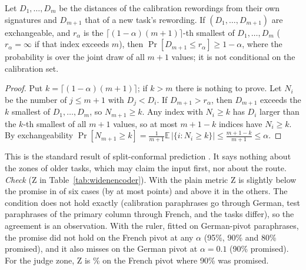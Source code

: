 \begin{table}[t]
  \caption{Sibling tasks that collide. (3): the unedited instruction of the arriving task lies inside the zone of the older task under the encoder zone (first 15 collisions of the file). (4): a French paraphrase of the first task is certified for the second (older or, when its own zone does not hold it, newer) under the judge zone (first 12 such cases); the score is the judge's score for that paraphrase against the instruction of the claiming task. ``--'': not among the cases listed.}
  \label{tab:widensiblings}
  \centering
  \footnotesize
  \setlength{\tabcolsep}{3pt}
  
\end{table}

\begin{proposition}
\label{prop:conformal}
Let $D_1, \dots, D_m$ be the distances of the calibration rewordings from their own signatures and
$D_{m+1}$ that of a new task's rewording. If $(D_1, \dots, D_{m+1})$ are exchangeable, and $r_\alpha$ is the
$\lceil (1-\alpha)(m+1) \rceil$-th smallest of $D_1, \dots, D_m$ ($r_\alpha = \infty$ if that index exceeds $m$), then
$\Pr[D_{m+1} \le r_\alpha] \ge 1 - \alpha$, where the probability is over the joint draw of all $m+1$ values; it is not conditional on the calibration set.
\end{proposition}

\begin{proof}
Put $k=\lceil(1-\alpha)(m+1)\rceil$; if $k>m$ there is nothing to prove. Let $N_i$ be the number of $j\le m+1$ with $D_j<D_i$. If $D_{m+1}>r_\alpha$, then
$D_{m+1}$ exceeds the $k$ smallest of $D_1,\dots,D_m$, so $N_{m+1}\ge k$. Any index with $N_i\ge k$ has $D_i$ larger than the $k$-th smallest of all $m+1$ values,
so at most $m+1-k$ indices have $N_i\ge k$. By exchangeability $\Pr[N_{m+1}\ge k]=\frac{1}{m+1}\mathbb{E}\,|\{i: N_i\ge k\}|\le\frac{m+1-k}{m+1}\le\alpha$.
\end{proof}

This is the standard result of split-conformal prediction \citep{vovk2005algorithmic,angelopoulos2023conformal}. It says nothing about the zones of older tasks, which may claim the input first, nor about the route. \emph{Check} (\textsf{Z} in Table~\ref{tab:widenencoder}). With the plain metric \textsf{Z} is slightly below the promise in \WidenPlainZBelowCount{} of six cases (by at most \WidenPlainZBelowMax{} points) and above it in the others. The condition does not hold exactly (calibration paraphrases go through German, test paraphrases of the primary column through French, and the tasks differ), so the agreement is an observation. With the ruler, fitted on German-pivot paraphrases, the promise did not hold on the French pivot at any $\alpha$ (95\%, 90\% and 80\% promised), and it also misses on the German pivot at $\alpha = 0.1$ (90\% promised). For the judge zone, \textsf{Z} is \WidenJudgeFrZ{}\% on the French pivot where 90\% was promised.

